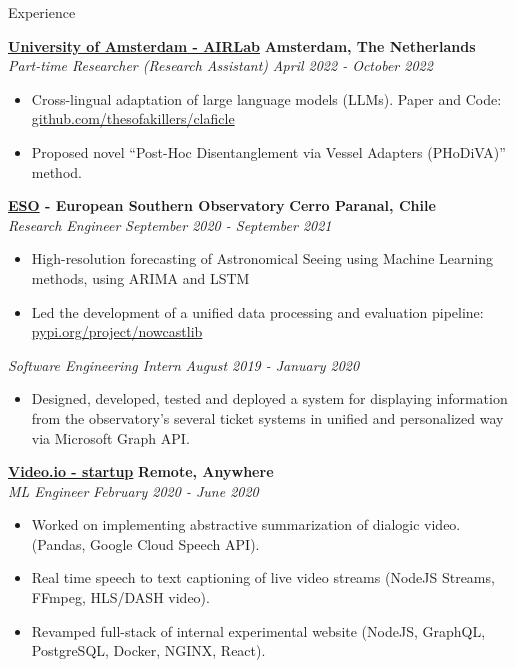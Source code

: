 \documentclass{resume} %
\begin{document}
\begin{rSection}{Experience}

	{\bf \href{https://icai.ai/airlab/}{University of Amsterdam - AIRLab}} \hfill \textbf{Amsterdam,
		The Netherlands}
	\\ \textit{Part-time Researcher (Research Assistant)} \hfill {\em April 2022 - October 2022}
	\begin{itemize}\vspace{-0.5em}
		\item Cross-lingual adaptation of large language models (LLMs). Paper and Code:
		      \href{https://github.com/thesofakillers/claficle}{github.com/thesofakillers/claficle}
		\item Proposed novel ``Post-Hoc Disentanglement via Vessel Adapters (PHoDiVA)'' method.
	\end{itemize}

	{\bf \href{https://www.eso.org}{ESO} - European Southern Observatory} \hfill \textbf{Cerro Paranal, Chile}
	\\ \textit{Research Engineer} \hfill {\em September 2020 - September 2021}
	\begin{itemize}\vspace{-0.5em}
		\item High-resolution forecasting of Astronomical Seeing using Machine Learning
		      methods, using ARIMA and LSTM
		\item Led the development of a unified data processing and evaluation
		      pipeline: \href{https://pypi.org/project/nowcastlib/}{pypi.org/project/nowcastlib}
	\end{itemize}
	\textit{Software Engineering Intern} \hfill {\em August 2019 - January 2020}
	\begin{itemize}\vspace{-0.5em}
		\item Designed, developed, tested and deployed a system for displaying information from the
		      observatory's several ticket systems in unified and personalized way via Microsoft Graph API.
	\end{itemize}

	{\bf \href{https://video.io/}{Video.io - startup}} \hfill \textbf{Remote, Anywhere}
	\\ \textit{ML Engineer} \hfill {\em February 2020 - June 2020}
	\begin{itemize}\vspace{-0.5em}
		\item Worked on implementing abstractive summarization of dialogic video. (Pandas, Google Cloud
		      Speech API).
		\item Real time speech to text captioning of live video streams (NodeJS Streams, FFmpeg,
		      HLS/DASH video).
		\item Revamped full-stack of internal experimental website (NodeJS, GraphQL, PostgreSQL, Docker,
		      NGINX, React).
	\end{itemize}


\end{rSection}
\end{document}
